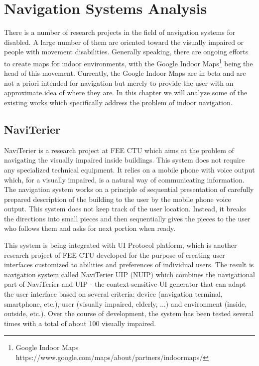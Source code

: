 \section{Navigation Systems Analysis}
\label{sec:nsa}
There is a number of research projects in the field of navigation systems for disabled. A large number of them are oriented toward the visually impaired or people with movement disabilities. Generally speaking, there are ongoing efforts to create maps for indoor environments, with the Google Indoor Maps\footnote[2]{Google Indoor Maps https://www.google.com/maps/about/partners/indoormaps/} being the head of this movement. Currently, the Google Indoor Maps are in beta and are not a priori intended for navigation but merely to provide the user with an approximate idea of where they are. In this chapter we will analyze some of the existing works which specifically address the problem of indoor navigation.

\subsection{NaviTerier}
NaviTerier \cite{naviterier} is a research project at FEE CTU which aims at the problem of navigating the visually impaired inside buildings. This system does not require any specialized technical equipment. It relies on a mobile phone with voice output which, for a visually impaired, is a natural way of communicating information. The navigation system works on a principle of sequential presentation of carefully prepared description of the building to the user by the mobile phone voice output. This system does not keep track of the user location. Instead, it breaks the directions into small pieces and then sequentially gives the pieces to the user who follows them and asks for next portion when ready.

This system is being integrated with UI Protocol platform, which is another research project of FEE CTU developed for the purpose of creating user interfaces customized to abilities and preferences of individual users. The result is navigation system called NaviTerier UIP (NUIP) \cite{balata} which combines the navigational part of NaviTerier and UIP - the context-sensitive UI generator that can adapt the user interface based on several criteria: device (navigation terminal, smartphone, etc.), user (visually impaired, elderly, ...) and environment (inside, outside, etc.). Over the course of development, the system has been tested several times with a total of about 100 visually impaired.


